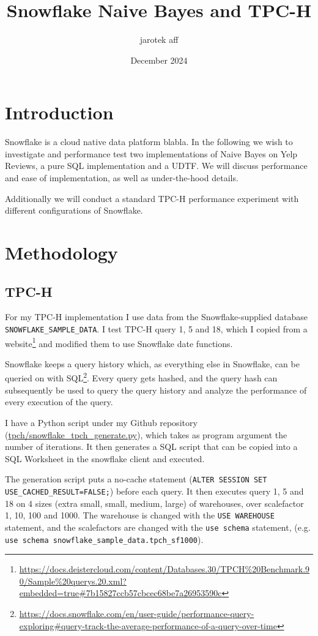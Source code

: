 \documentclass{article}
\title{Snowflake Naive Bayes and TPC-H}
\author{jarotek aff}
\date{December 2024}
\begin{document}
\maketitle

\section{Introduction}
Snowflake\cite{snowflake_2016} is a cloud native data platform blabla. 
In the following we wish to investigate and performance test two implementations of Naive Bayes on Yelp Reviews, a pure SQL implementation and a UDTF. We will discuss performance and ease of implementation, as well as under-the-hood details. 

\bigskip
Additionally we will conduct a standard TPC-H performance experiment with different configurations of Snowflake. 

\section{Methodology}

\subsection{TPC-H}
For my TPC-H implementation I use data from the Snowflake-supplied database \texttt{SNOWFLAKE\_SAMPLE\_DATA}. I test TPC-H query 1, 5 and 18, which I copied from a website\footnote{\url{https://docs.deistercloud.com/content/Databases.30/TPCH\%20Benchmark.90/Sample\%20querys.20.xml?embedded=true\#7b15827ccb57cbcec68be7a26953590c}} and modified them to use Snowflake date functions. 

\medskip \noindent Snowflake keeps a query history which, as everything else in Snowflake, can be queried on with SQL\footnote{\url{https://docs.snowflake.com/en/user-guide/performance-query-exploring#query-track-the-average-performance-of-a-query-over-time}}. Every query gets hashed, and the query hash can subsequently be used to query the query history and analyze the performance of every execution of the query.

\medskip \noindent I have a Python script under my Github repository (\url{tpch/snowflake_tpch_generate.py}), which takes as program argument the number of iterations. It then generates a SQL script that can be copied into a SQL Worksheet in the snowflake client and executed. 

\medskip \noindent The generation script puts a no-cache statement (\texttt{ALTER SESSION SET USE\_CACHED\_RESULT=FALSE;}) before each query. It then executes query 1, 5 and 18 on 4 sizes (extra small, small, medium, large) of warehouses, over scalefactor 1, 10, 100 and 1000. The warehouse is changed with the \texttt{USE WAREHOUSE} statement, and the scalefactors are changed with the \texttt{use schema} statement, (e.g. \texttt{use schema snowflake\_sample\_data.tpch\_sf1000}).
\end{document}

